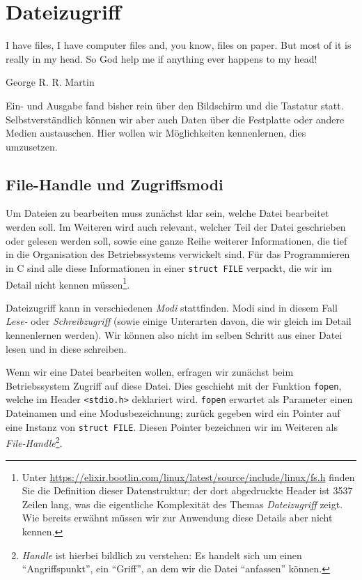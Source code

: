\chapter{Dateizugriff}
\epigraph{I have files, I have computer files and, you know, files on paper. But most of it is really in my head. So God help me if anything ever happens to my head!}{George R. R. Martin}

Ein- und Ausgabe fand bisher rein über den Bildschirm und die Tastatur statt. Selbstverständlich können wir aber auch Daten über die Festplatte oder andere Medien austauschen. Hier wollen wir Möglichkeiten kennenlernen, dies umzusetzen.

\section{File-Handle und Zugriffsmodi} \label{sec:fileAccess}
Um Dateien zu bearbeiten muss zunächst klar sein, welche Datei bearbeitet werden soll. Im Weiteren wird auch relevant, welcher Teil der Datei geschrieben oder gelesen werden soll, sowie eine ganze Reihe weiterer Informationen, die tief in die Organisation des Betriebssystems verwickelt sind. Für das Programmieren in C sind alle diese Informationen in einer \texttt{struct FILE} verpackt, die wir im Detail nicht kennen müssen\footnote{Unter \url{https://elixir.bootlin.com/linux/latest/source/include/linux/fs.h} finden Sie die Definition dieser Datenstruktur; der dort abgedruckte Header ist 3537 Zeilen lang, was die eigentliche Komplexität des Themas \emph{Dateizugriff} zeigt. Wie bereits erwähnt müssen wir zur Anwendung diese Details aber nicht kennen.}.

Dateizugriff kann in verschiedenen \emph{Modi} stattfinden. Modi sind in diesem Fall \emph{Lese-} oder \emph{Schreibzugriff} (sowie einige Unterarten davon, die wir gleich im Detail kennenlernen werden). Wir können also nicht im selben Schritt aus einer Datei lesen und in diese schreiben.

Wenn wir eine Datei bearbeiten wollen, erfragen wir zunächst beim Betriebssystem Zugriff auf diese Datei. Dies geschieht mit der Funktion \texttt{fopen}, welche im Header \texttt{<stdio.h>} deklariert wird. \texttt{fopen} erwartet als Parameter einen Dateinamen und eine Modusbezeichnung; zurück gegeben wird ein Pointer auf eine Instanz von \texttt{struct FILE}. Diesen Pointer bezeichnen wir im Weiteren als \emph{File-Handle}\footnote{\emph{Handle} ist hierbei bildlich zu verstehen: Es handelt sich um einen \enquote{Angriffspunkt}, ein \enquote{Griff}, an dem wir die Datei \enquote{anfassen} können.}.

